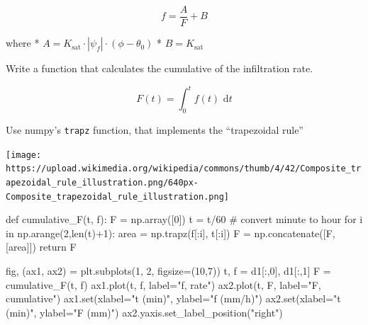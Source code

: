 \documentclass[
  letterpaper,
  DIV=11,
  numbers=noendperiod]{scrreprt}
\newenvironment{Shaded}{\begin{snugshade}}{\end{snugshade}}
\newcommand{\BuiltInTok}[1]{\textcolor[rgb]{0.00,0.23,0.31}{#1}}
\newcommand{\CommentTok}[1]{\textcolor[rgb]{0.37,0.37,0.37}{#1}}
\newcommand{\ControlFlowTok}[1]{\textcolor[rgb]{0.00,0.23,0.31}{#1}}
\newcommand{\DecValTok}[1]{\textcolor[rgb]{0.68,0.00,0.00}{#1}}
\newcommand{\KeywordTok}[1]{\textcolor[rgb]{0.00,0.23,0.31}{#1}}
\newcommand{\NormalTok}[1]{\textcolor[rgb]{0.00,0.23,0.31}{#1}}
\newcommand{\OperatorTok}[1]{\textcolor[rgb]{0.37,0.37,0.37}{#1}}
\newcommand{\StringTok}[1]{\textcolor[rgb]{0.13,0.47,0.30}{#1}}
\begin{document}
\[f = \frac{A}{F} + B\]

where *
\(A = K_\text{sat}\cdot|\psi_f|\cdot \left( \phi - \theta_0 \right)\) *
\(B= K_\text{sat}\)

Write a function that calculates the cumulative of the infiltration
rate.

\[
F(t) = \int_0^t f(t) \text{ d}t
\]

Use numpy's \texttt{trapz} function, that implements the ``trapezoidal
rule''

\texttt{[image: https://upload.wikimedia.org/wikipedia/commons/thumb/4/42/Composite\_trapezoidal\_rule\_illustration.png/640px-Composite\_trapezoidal\_rule\_illustration.png]}

\begin{Shaded}
\begin{Highlighting}[]
\KeywordTok{def}\NormalTok{ cumulative\_F(t, f):}
\NormalTok{    F }\OperatorTok{=}\NormalTok{ np.array([}\DecValTok{0}\NormalTok{])}
\NormalTok{    t }\OperatorTok{=}\NormalTok{ t}\OperatorTok{/}\DecValTok{60} \CommentTok{\# convert minute to hour}
    \ControlFlowTok{for}\NormalTok{ i }\KeywordTok{in}\NormalTok{ np.arange(}\DecValTok{2}\NormalTok{,}\BuiltInTok{len}\NormalTok{(t)}\OperatorTok{+}\DecValTok{1}\NormalTok{):}
\NormalTok{        area }\OperatorTok{=}\NormalTok{ np.trapz(f[:i], t[:i])}
\NormalTok{        F }\OperatorTok{=}\NormalTok{ np.concatenate([F, [area]])}
    \ControlFlowTok{return}\NormalTok{ F}

\NormalTok{fig, (ax1, ax2) }\OperatorTok{=}\NormalTok{ plt.subplots(}\DecValTok{1}\NormalTok{, }\DecValTok{2}\NormalTok{, figsize}\OperatorTok{=}\NormalTok{(}\DecValTok{10}\NormalTok{,}\DecValTok{7}\NormalTok{))}
\NormalTok{t, f }\OperatorTok{=}\NormalTok{ d1[:,}\DecValTok{0}\NormalTok{], d1[:,}\DecValTok{1}\NormalTok{]}
\NormalTok{F }\OperatorTok{=}\NormalTok{ cumulative\_F(t, f)}
\NormalTok{ax1.plot(t, f, label}\OperatorTok{=}\StringTok{"f, rate"}\NormalTok{)}
\NormalTok{ax2.plot(t, F, label}\OperatorTok{=}\StringTok{"F, cumulative"}\NormalTok{)}
\NormalTok{ax1.}\BuiltInTok{set}\NormalTok{(xlabel}\OperatorTok{=}\StringTok{"t (min)"}\NormalTok{,}
\NormalTok{        ylabel}\OperatorTok{=}\StringTok{"f (mm/h)"}\NormalTok{)}
\NormalTok{ax2.}\BuiltInTok{set}\NormalTok{(xlabel}\OperatorTok{=}\StringTok{"t (min)"}\NormalTok{,}
\NormalTok{        ylabel}\OperatorTok{=}\StringTok{"F (mm)"}\NormalTok{)}
\NormalTok{ax2.yaxis.set\_label\_position(}\StringTok{"right"}\NormalTok{)}
\end{Highlighting}
\end{Shaded}
\end{document}
